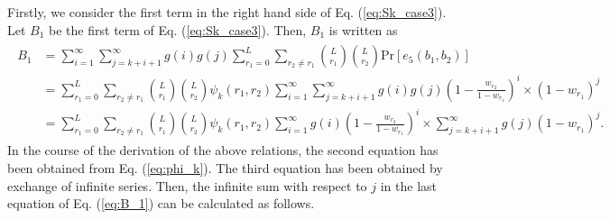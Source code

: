 %
Firstly, we consider the first term in the right hand side of Eq. (\ref{eq:Sk_case3}). Let $B_1$ be the first term of Eq. (\ref{eq:Sk_case3}). Then, $B_1$ is written as
\begin{align}\begin{split}\label{eq:B_1}
  B_1
  &=\sum_{i=1}^{\infty}\sum_{j=k+i+1}^{\infty} g(i)g(j) \sum_{r_1=0}^{L} \sum_{r_2 \neq r_1} \binom{L}{r_1}\binom{L}{r_2}\mathrm{Pr}[e_5(b_1,b_2)] \\
  &=\sum_{r_1=0}^{L} \sum_{r_2 \neq r_1} \binom{L}{r_1}\binom{L}{r_2}\psi_k(r_1,r_2)
  \sum_{i=1}^{\infty} \sum_{j=k+i+1}^{\infty} g(i)g(j) \left(1-\frac{w_{r_2}}{1-w_{r_1}} \right)^{i} \times (1-w_{r_1})^j \\
  &=\sum_{r_1=0}^{L} \sum_{r_2 \neq r_1} \binom{L}{r_1}\binom{L}{r_2}\psi_k(r_1,r_2)
  \sum_{i=1}^{\infty} g(i)\left(1-\frac{w_{r_2}}{1-w_{r_1}} \right)^{i} \times \sum_{j=k+i+1}^{\infty} g(j) (1-w_{r_1})^j.
\end{split}\end{align}
In the course of the derivation of the above relations, the second equation has been obtained from Eq. (\ref{eq:phi_k}). The third equation has been obtained by exchange of infinite series.
%
Then, the infinite sum with respect to $j$ in the last equation of Eq. (\ref{eq:B_1}) can be calculated as follows.
